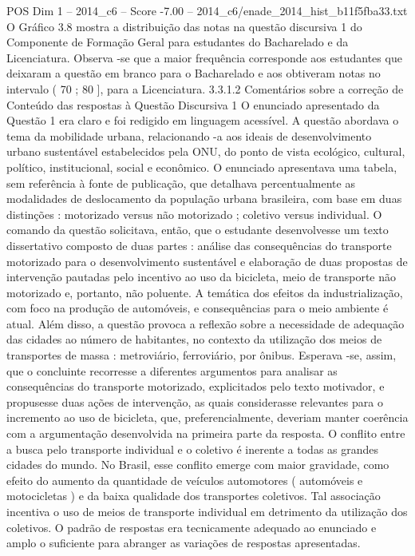 \begin{textsample}{POS Dim 1 – 2014\_c6 – Score -7.00 – 2014\_c6/enade\_2014\_hist\_b11f5fba33.txt}
O Gráfico 3.8 mostra a distribuição das notas na questão discursiva 1 do Componente de Formação Geral para estudantes do Bacharelado e da Licenciatura.
Observa -se que a maior frequência corresponde aos estudantes que deixaram a questão em branco para o Bacharelado e aos obtiveram notas no intervalo ( 70 ; 80 ], para a Licenciatura. 3.3.1.2 Comentários sobre a correção de Conteúdo das respostas à Questão Discursiva 1 O enunciado apresentado da Questão 1 era claro e foi redigido em linguagem acessível.
A questão abordava o tema da mobilidade urbana, relacionando -a aos ideais de desenvolvimento urbano sustentável estabelecidos pela ONU, do ponto de vista ecológico, cultural, político, institucional, social e econômico.
O enunciado apresentava uma tabela, sem referência à fonte de publicação, que detalhava percentualmente as modalidades de deslocamento da população urbana brasileira, com base em duas distinções : motorizado versus não motorizado ; coletivo versus individual.
O comando da questão solicitava, então, que o estudante desenvolvesse um texto dissertativo composto de duas partes : análise das consequências do transporte motorizado para o desenvolvimento sustentável e elaboração de duas propostas de intervenção pautadas pelo incentivo ao uso da bicicleta, meio de transporte não motorizado e, portanto, não poluente.
A temática dos efeitos da industrialização, com foco na produção de automóveis, e consequências para o meio ambiente é atual.
Além disso, a questão provoca a reflexão sobre a necessidade de adequação das cidades ao número de habitantes, no contexto da utilização dos meios de transportes de massa : metroviário, ferroviário, por ônibus.
Esperava -se, assim, que o concluinte recorresse a diferentes argumentos para analisar as consequências do transporte motorizado, explicitados pelo texto motivador, e propusesse duas ações de intervenção, as quais considerasse relevantes para o incremento ao uso de bicicleta, que, preferencialmente, deveriam manter coerência com a argumentação desenvolvida na primeira parte da resposta.
O conflito entre a busca pelo transporte individual e o coletivo é inerente a todas as grandes cidades do mundo.
No Brasil, esse conflito emerge com maior gravidade, como efeito do aumento da quantidade de veículos automotores ( automóveis e motocicletas ) e da baixa qualidade dos transportes coletivos.
Tal associação incentiva o uso de meios de transporte individual em detrimento da utilização dos coletivos.
O padrão de respostas era tecnicamente adequado ao enunciado e amplo o suficiente para abranger as variações de respostas apresentadas.

\end{textsample}
